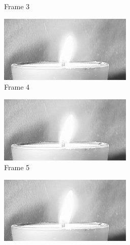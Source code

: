 \documentclass[a4paper, landscape]{article}
\begin{document}
\begin{figure}[H]
\begin{subfigure}{0.13\linewidth}
		\caption{Frame 3}
	\end{subfigure}
	\begin{subfigure}{0.13\linewidth}
		\centering
		\includegraphics[width=\linewidth]{flame/frame = 4.png}
		\caption{Frame 4}
	\end{subfigure}
	\begin{subfigure}{0.13\linewidth}
		\centering
		\includegraphics[width=\linewidth]{flame/frame = 5.png}
		\caption{Frame 5}
	\end{subfigure}
	\begin{subfigure}{0.13\linewidth}
		\centering
		\includegraphics[width=\linewidth]{flame/frame = 6.png}

\end{subfigure}
\end{figure}
\end{document}
